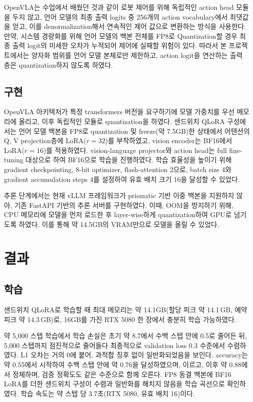 \documentclass[11pt,a4paper]{article}
\begin{document}
OpenVLA는 수업에서 배웠던 것과 같이 로봇 제어를 위해 독립적인 action head 모듈을 두지 않고,
언어 모델의 최종 출력 logits 중 256개의 action vocabulary에서 최댓값을 얻고, 이를 denormalization해서
연속적인 제어 값으로 변환하는 방식을 사용한다. 만약, 시스템 경량화를 위해 언어 모델의 백본 전체를
FP8로 Quantization할 경우 최종 출력 logit의 미세한 오차가 누적되어 제어에 실패할 위험이 있다.
따라서 본 프로젝트에서는 양자화 범위를 언어 모델 본체로만 제한하고,
action logit을 연산하는 출력 층은 quantization하지 않도록 하였다.


\subsection{구현}
\label{subsec:quant-impl}

OpenVLA 아키텍처가 특정 transformers 버전을 요구하기에 모델 가중치를 우선 메모리에 올리고,
이후 독립적인 모듈로 quantization을 하였다.
샌드위치 QLoRA 구성에서는 언어 모델 백본을 FP8로 quantization 및 freeze(약 7.5GB)한 상태에서 어텐션의
Q, V projection층에 LoRA($r=32$)를 부착하였고, vision encoder는 BF16에서 LoRA($r=16$)를 적용하였다.
vision-language projector와 action head는 full fine-tuning 대상으로 하여 BF16으로 학습을 진행하였다.
학습 효율성을 높이기 위해 gradient checkpointing, 8-bit optimizer, flash-attention 2으로,
batch size 4와 gradient accumulation steps 4를 설정하여 유효 배치 크기 16을 달성할 수 있었다.

추론 단계에서는 현재 vLLM 프레임워크가 prismatic 기반 이중 백본을 지원하지 않아,
기존 FastAPI 기반의 추론 서버를 구현하였다. 이때, OOM을 방지하기 위해,
CPU 메모리에 모델을 먼저 로드한 후 layer-wise하게 quantization하여 GPU로 넘기도록 하였다.
이를 통해 약 14.5GB의 VRAM만으로 모델을 올릴 수 있었다.

\section{결과}
\label{sec:results}

\subsection{학습}
\label{subsec:train-result}

샌드위치 QLoRA로 학습할 때 최대 메모리는 약 14.1GB(할당 피크 약 14.1\,GB, 예약 피크 약 14.3\,GB)로,
16GB를 가진 RTX 5080 한 장에서 충분히 학습 가능하였다.

약 5,000 스텝 학습에서 학습 손실은 초기 약 8.7에서 수백 스텝 안에 0.5로 줄어든 뒤, 5,000 스텝까지
점진적으로 줄어들다 최종적으로 validation loss 0.3 수준에서 수렴하였다. L1 오차는 거의 0에 붙어,
과적합 징후 없이 일반화되었음을 보인다. accuracy는 약 0.55에서 시작하여 수백 스텝 안에 약 0.76을 달성하였으며,
이르고, 이후 약 0.88에서 정체하며, 검증 정확도도 같은 수준으로 함께 오른다. FP8 동결 백본에
BF16 LoRA를 더한 샌드위치 구성이 수렴과 일반화를 해치지 않음을 학습 곡선으로 확인하였다. 학습 속도는
약 스텝 당 3.7초(RTX 5080, 유효 배치 16)이다.
\end{document}
